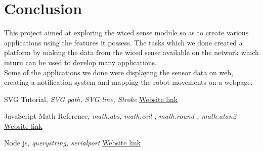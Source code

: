 \documentclass[a4paper,12pt,oneside]{book}
\begin{document}

\newpage
\section{Conclusion}
 \hspace{10mm}This project aimed at exploring the wiced sense module so as to create various applications using the features it possess. The tasks which we done created a platform by making the data from the wiced sense available on the network which inturn can be used to develop many applications. \\
 \hspace{10mm}Some of the applications we done were displaying the sensor data on web, creating a notification system and mapping the robot movements on a webpage.

\newpage
\begin{thebibliography}{li}

SVG Tutorial, {\em SVG path, SVG line, Stroke}  
\href{http://www.w3schools.com/svg/}{Website link}

JavaScript Math Reference, {\em math.abs, math.ceil , math.round , math.atan2}  
\href{http://www.w3schools.com/jsref/jsref_obj_math.asp}{Website link}

Node js, {\em querystring, serialport}  
\href{https://nodejs.org/}{Website link}



\end{thebibliography}
\end{document}
